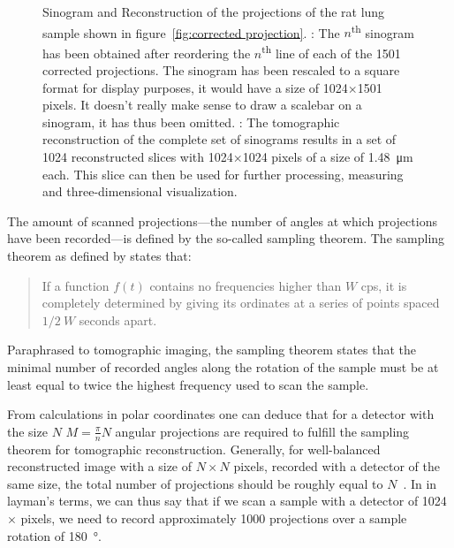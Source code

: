 \begin{figure}
{%
		\label{subfig:rec}%
		}%
	\caption[Sinogram and Reconstruction]{Sinogram and Reconstruction of the projections of the rat lung sample shown in figure~\ref{fig:corrected projection}. : The $n$\textsuperscript{th} sinogram has been obtained after reordering the $n$\textsuperscript{th} line of each of the 1501 corrected projections. The sinogram has been rescaled to a square format for display purposes, it would have a size of 1024$\times$1501 pixels. It doesn't really make sense to draw a scalebar on a sinogram, it has thus been omitted. : The tomographic reconstruction of the complete set of sinograms results in a set of 1024 reconstructed slices with 1024$\times$1024 pixels of a size of \SI{1.48}{\micro\meter} each. This slice can then be used for further processing, measuring and three-dimensional visualization.}
	\label{fig:Sin Rec}
\end{figure}

The amount of scanned projections---the number of angles at which projections have been recorded---is defined by the so-called sampling theorem. The sampling theorem as defined by \citet{Shannon1949} states that: \begin{quote}If a function $f(t)$ contains no frequencies higher than $W$ cps, it is completely determined by giving its ordinates at a series of points spaced $1/2\ W$ seconds apart. \cite{Shannon1949}\end{quote}

Paraphrased to tomographic imaging, the sampling theorem states that the minimal number of recorded angles along the rotation of the sample must be at least equal to twice the highest frequency used to scan the sample.

From calculations in polar coordinates one can deduce that for a detector with the size $N$ $M=\frac{\pi}{n}N$ angular projections are required to fulfill the sampling theorem for tomographic reconstruction. Generally, for well-balanced reconstructed image with a size of $N\times N$ pixels, recorded with a detector of the same size, the total number of projections should be roughly equal to $N$~\cite{Kak2002}. In in layman's terms, we can thus say that if we scan a sample with a detector of 1024$\times$ pixels, we need to record approximately 1000 projections over a sample rotation of \SI{180}{\degree}.

